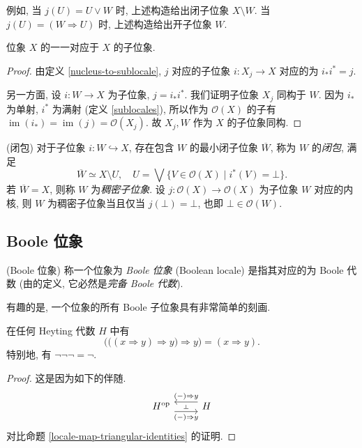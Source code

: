 例如, 当 $j(U) = U\lor W$ 时, 上述构造给出闭子位象 $X\setminus W$. 当 $j(U) = (W\Rightarrow U)$ 时, 上述构造给出开子位象 $W$.

\begin{prop}
	{}
	位象 $X$ 的\nc{}一一对应于 $X$ 的子位象.
\end{prop}
\begin{proof}
	由定义 \ref{nucleus-to-sublocale}, \nc{} $j$ 对应的子位象 $i\colon X_j\to X$ 对应的\nc{}为 $i_*i^* = j$.
	
	另一方面, 设 $i\colon W\to X$ 为子位象, $j=i_*i^*$. 我们证明子位象 $X_j$ 同构于 $W$.
	因为 $i_*$ 为单射, $i^*$ 为满射 (定义 \ref{sublocales}),
	所以作为 $\mathcal O(X)$ 的子\fm{}有 $\operatorname{im}(i_*) = \operatorname{im}(j)=\mathcal O(X_j)$.
	故 $X_j, W$ 作为 $X$ 的子位象同构.
\end{proof}


\begin{propdef}
	{(闭包)}
	对于子位象 $i\colon W \hookrightarrow X$, 存在包含 $W$ 的最小闭子位象 $\overline{W}$, 称为 $W$ 的\emph{闭包},
	满足
	\[
	\overline{W} \simeq X\setminus U,\quad U= \bigvee \{V\in\mathcal O(X)\mid i^*(V) =\bot\}.
	\]
	若 $\overline{W} = X$, 则称 $W$ 为\emph{稠密子位象}.
	设 $j\colon \mathcal O(X)\to\mathcal O(X)$ 为子位象 $W$ 对应的内核, 则 $W$ 为稠密子位象当且仅当 $j(\bot) = \bot$, 也即 $\bot\in\mathcal O(W)$.
\end{propdef}

\subsection{Boole 位象}

\begin{definition}
	[label={Boolean-locale}]
	{(Boole 位象)}
	称一个位象为 \emph{Boole 位象} (Boolean locale) 是指其对应的\fm{}为 Boole 代数 (由\fm{}的定义, 它必然是\emph{完备 Boole 代数}).
\end{definition}

有趣的是, 一个位象的所有 Boole 子位象具有非常简单的刻画.

\newcommand{\booleansublocale}[1]{\text{B}(#1)}

\begin{prop}
	[label={xyyy-xy}]
	{}
	在任何 Heyting 代数 $H$ 中有
	\[
	\Big(\big((x\Rightarrow y) \Rightarrow y\big) \Rightarrow y\Big) = (x\Rightarrow y).
	\]
	特别地, 有 $\neg\neg\neg = \neg$.
\end{prop}
\begin{proof}
	这是因为如下的伴随.
	\[\begin{tikzcd}
		{H^{\op}} & {H}
		\arrow[""{name=0, anchor=center, inner sep=0}, "(-)\Rightarrow y"', shift right=2, from=1-1, to=1-2]
		\arrow[""{name=1, anchor=center, inner sep=0}, "(-)\Rightarrow y"', shift right=2, from=1-2, to=1-1]
		\arrow["\dashv"{anchor=center, rotate=-90}, draw=none, from=1, to=0]
	\end{tikzcd}\]
	对比命题 \ref{locale-map-triangular-identities} 的证明.
\end{proof}

